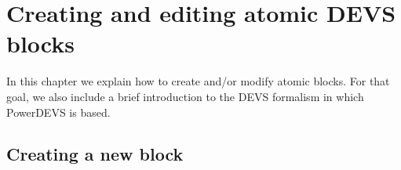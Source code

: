 \chapter{Creating and editing atomic DEVS blocks}
In this chapter we explain how to create and/or modify atomic blocks. For that goal, we also include a brief introduction to the DEVS formalism in which PowerDEVS is based.

\section{Creating a new block}
 